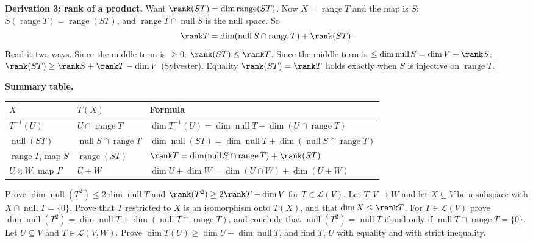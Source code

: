 \documentclass[11pt]{scrartcl}
\DeclareMathOperator{\nul}{null}
\DeclareMathOperator{\range}{range}
\newcommand{\LL}{\mathcal L}
\begin{document}
\medskip\noindent\textbf{Derivation 3: rank of a product.} Want $\rank(ST)=\dim\range(ST)$. Now $X=\range T$ and the map is $S$: $S(\range T)=\range(ST)$, and $\range T\cap\nul S$ is the null space. So
\[ \rank T=\dim(\nul S\cap\range T)+\rank(ST). \]
Read it two ways. Since the middle term is $\ge0$: $\rank(ST)\le\rank T$. Since the middle term is $\le\dim\nul S=\dim V-\rank S$: $\rank(ST)\ge\rank S+\rank T-\dim V$ (Sylvester). Equality $\rank(ST)=\rank T$ holds exactly when $S$ is injective on $\range T$.

\medskip\noindent\textbf{Summary table.}
\begin{center}
\renewcommand{\arraystretch}{1.2}
\small\begin{tabular}{lll}
$X$ & $T(X)$ & Formula \\ \hline
$T^{-1}(U)$ & $U\cap\range T$ & $\dim T^{-1}(U)=\dim\nul T+\dim(U\cap\range T)$ \\
$\nul(ST)$ & $\nul S\cap\range T$ & $\dim\nul(ST)=\dim\nul T+\dim(\nul S\cap\range T)$ \\
$\range T$, map $S$ & $\range(ST)$ & $\rank T=\dim(\nul S\cap\range T)+\rank(ST)$ \\
$U\times W$, map $\Gamma$ & $U+W$ & $\dim U+\dim W=\dim(U\cap W)+\dim(U+W)$
\end{tabular}
\end{center}
\probs
\begin{enumerate}[(a)]
  \ii Prove $\dim\nul(T^2)\le2\dim\nul T$ and $\rank(T^2)\ge2\rank T-\dim V$ for $T\in\LL(V)$.
  \ii Let $T\colon V\to W$ and let $X\subseteq V$ be a subspace with $X\cap\nul T=\{0\}$. Prove that $T$ restricted to $X$ is an isomorphism onto $T(X)$, and that $\dim X\le\rank T$.
  \ii For $T\in\LL(V)$ prove $\dim\nul(T^2)=\dim\nul T+\dim(\nul T\cap\range T)$, and conclude that $\nul(T^2)=\nul T$ if and only if $\nul T\cap\range T=\{0\}$.
  \ii Let $U\subseteq V$ and $T\in\LL(V,W)$. Prove $\dim T(U)\ge\dim U-\dim\nul T$, and find $T$, $U$ with equality and with strict inequality.
\end{enumerate}
\end{document}
